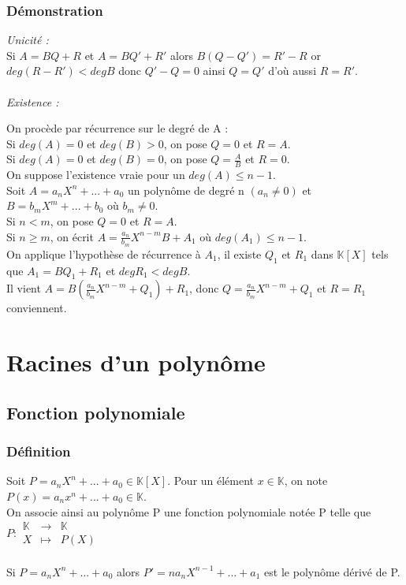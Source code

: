 \documentclass[a4paper,10pt]{book} %
\newcommand{\K}{\mathbb{K}}
\begin{document}
\subsubsection{Démonstration}
\emph{Unicité :}\\
Si $A=BQ+R$ et $A=BQ'+R'$ alors $B(Q-Q')=R'-R$ or $deg(R-R')<deg B$ donc $Q'-Q=0$ ainsi $Q=Q'$ d'où aussi $R=R'$.\\\\

\emph{Existence :}

On procède par récurrence sur le degré de A :\\
Si $deg(A)=0$ et $deg(B)>0$, on pose $Q=0$ et $R=A$.\\
Si $deg(A)=0$ et $deg(B)=0$, on pose $Q=\frac{A}{B}$ et $R=0$.\\

On suppose l'existence vraie pour un $deg(A)\leq n-1$.\\
Soit $A=a_{n}X^{n}+...+a_{0}$ un polynôme de degré n $(a_{n}\neq 0)$ et $B=b_{m}X^{m}+...+b_{0}$ où $b_{m}\neq 0$.\\
Si $n<m$, on pose $Q=0$ et $R=A$.\\
Si $n\geq m$, on écrit $A=\frac{a_{n}}{b_{m}}X^{n-m} B+A_{1}$ où $deg(A_{1})\leq n-1$.\\

On applique l'hypothèse de récurrence à $A_{1}$, il existe $Q_{1}$ et $R_{1}$ dans $\K[X]$ tels que $A_{1}=BQ_{1}+R_{1}$ et $deg R_{1}<deg B$.\\

Il vient $A=B(\frac{a_{n}}{b_{m}}X^{n-m}+Q_{1})+R_{1}$, donc $Q=\frac{a_{n}}{b_{m}}X^{n-m}+Q_{1}$ et $R=R_{1}$ conviennent.

\newpage

\section{Racines d'un polynôme}
\subsection{Fonction polynomiale}
\subsubsection{Définition}
Soit $P=a_{n}X^{n}+...+a_{0} \in \K[X]$. Pour un élément $x\in \K$, on note $P(x)=a_{n}x^{n}+...+a_{0} \in \K$.\\

On associe ainsi au polynôme P une fonction polynomiale notée P telle que $P : \begin{array}{rcl}
\K&\rightarrow& \K \\
X &\mapsto& P(X)
\end{array}$\\\\
Si $P=a_{n}X^{n}+...+a_{0}$ alors $P'=na_{n}X^{n-1}+...+a_{1}$ est le polynôme dérivé de P.
\end{document}
